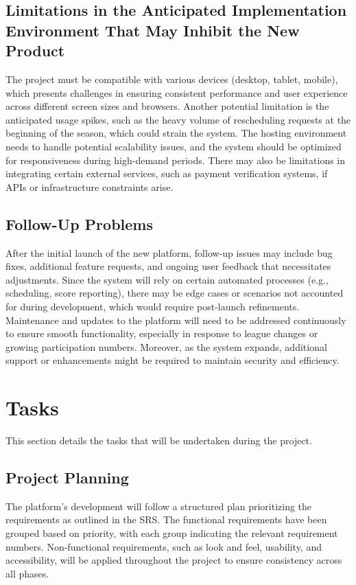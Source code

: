 \documentclass[12pt, titlepage]{article}
\begin{document}
\subsection{Limitations in the Anticipated Implementation Environment That May
Inhibit the New Product}
The project must be compatible with various devices (desktop, tablet, mobile), which presents challenges in ensuring consistent performance and user experience across different screen sizes and browsers. Another potential limitation is the anticipated usage spikes, such as the heavy volume of rescheduling requests at the beginning of the season, which could strain the system. The hosting environment needs to handle potential scalability issues, and the system should be optimized for responsiveness during high-demand periods. There may also be limitations in integrating certain external services, such as payment verification systems, if APIs or infrastructure constraints arise.
\subsection{Follow-Up Problems}
After the initial launch of the new platform, follow-up issues may include bug fixes, additional feature requests, and ongoing user feedback that necessitates adjustments. Since the system will rely on certain automated processes (e.g., scheduling, score reporting), there may be edge cases or scenarios not accounted for during development, which would require post-launch refinements. Maintenance and updates to the platform will need to be addressed continuously to ensure smooth functionality, especially in response to league changes or growing participation numbers. Moreover, as the system expands, additional support or enhancements might be required to maintain security and efficiency.

\section{Tasks}
This section details the tasks that will be undertaken during the project.

\subsection{Project Planning}
The platform's development will follow a structured plan prioritizing the requirements as outlined in the SRS. The functional requirements have been grouped based on priority, with each group indicating the relevant requirement numbers. Non-functional requirements, such as look and feel, usability, and accessibility, will be applied throughout the project to ensure consistency across all phases.
\end{document}
